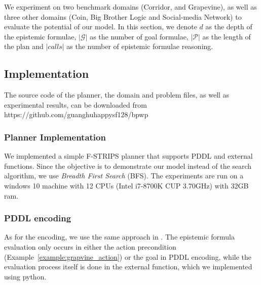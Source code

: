 We experiment on two benchmark domains (Corridor, and Grapevine), as well as three other domains (Coin, Big Brother Logic and Social-media Network) to evaluate the potential of our model.
In this section, we denote $d$ as the depth of the epistemic formulae, $|\mathcal{G}|$ as the number of goal formulae, $|\mathcal{P}|$ as the length of the plan and $|calls|$ as the number of epistemic formulae reasoning.



\subsection{Implementation}
The source code of the planner, the domain and problem files, as well as experimental results, can be downloaded from https://github.com/guanghuhappysf128/bpwp

\subsubsection{Planner Implementation} 
We implemented a simple F-STRIPS planner that supports PDDL and external functions. 
Since the objective is to demonstrate our model instead of the search algorithm, we use \emph{Breadth First Search} (BFS).
The experiments are run on a windows 10 machine with 12 CPUs (Intel i7-8700K CUP \@ 3.70GHz) with 32GB ram. 

\subsubsection{PDDL encoding}
As for the encoding, we use the same approach in \citet{Hu2022-ul}.
The epistemic formula evaluation only occurs in either the action precondition (Example~\ref{example:grapvine_action}) or the goal in PDDL encoding, while the evaluation process itself is done in the external function, which we implemented using python.




